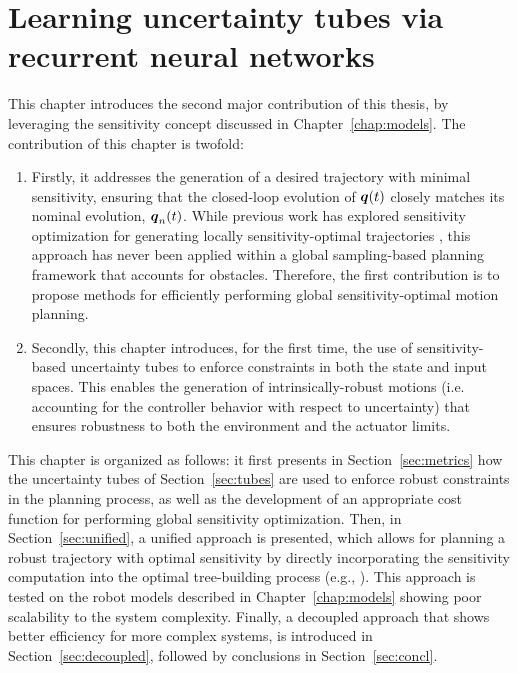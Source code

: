\chapter{Learning uncertainty tubes via recurrent neural networks} \label{chap:NN}

This chapter introduces the second major contribution of this thesis, by leveraging the sensitivity concept discussed in Chapter~\ref{chap:models}.
The contribution of this chapter is twofold:
\begin{enumerate}
    \item Firstly, it addresses the generation of a desired trajectory with minimal sensitivity, ensuring that the closed-loop evolution of $\boldsymbol{q}(t)$ closely matches its nominal evolution, $\boldsymbol{q}_n(t)$. 
    While previous work has explored sensitivity optimization for generating locally sensitivity-optimal trajectories \cite{cPi, cTh}, this approach has never been applied within a global sampling-based planning framework that accounts for obstacles. 
    Therefore, the first contribution is to propose methods for efficiently performing global sensitivity-optimal motion planning.
    \item Secondly, this chapter introduces, for the first time, the use of sensitivity-based uncertainty tubes to enforce constraints in both the state and input spaces. 
    This enables the generation of intrinsically-robust motions (i.e. accounting for the controller behavior with respect to uncertainty) that ensures robustness to both the environment and the actuator limits.
\end{enumerate}
This chapter is organized as follows: it first presents in Section~\ref{sec:metrics} how the uncertainty tubes of Section~\ref{sec:tubes} are used to enforce robust constraints in the planning process, as well as the development of an appropriate cost function for performing global sensitivity optimization.
Then, in Section~\ref{sec:unified}, a unified approach is presented, which allows for planning a robust trajectory with optimal sensitivity by directly incorporating the sensitivity computation into the optimal tree-building process (e.g., ). 
This approach is tested on the robot models described in Chapter~\ref{chap:models} showing poor scalability to the system complexity.
Finally, a decoupled approach that shows better efficiency for more complex systems, is introduced in Section~\ref{sec:decoupled}, followed by conclusions in Section~\ref{sec:concl}.

